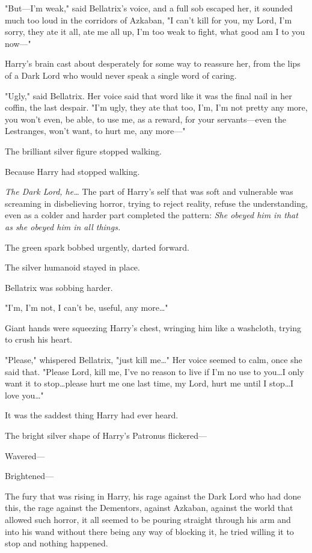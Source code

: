 "But---I'm weak," said Bellatrix's voice, and a full sob escaped her, it
sounded much too loud in the corridors of Azkaban, "I can't kill for you, my
Lord, I'm sorry, they ate it all, ate me all up, I'm too weak to fight, what
good am I to you now---"

Harry's brain cast about desperately for some way to reassure her, from the
lips of a Dark Lord who would never speak a single word of caring.

"Ugly," said Bellatrix. Her voice said that word like it was the final nail in
her coffin, the last despair. "I'm ugly, they ate that too, I'm, I'm not pretty
any more, you won't even, be able, to use me, as a reward, for your
servants---even the Lestranges, won't want, to hurt me, any more---"

The brilliant silver figure stopped walking.

Because Harry had stopped walking.

\emph{The Dark Lord, he…} The part of Harry's self that was soft and
vulnerable was screaming in disbelieving horror, trying to reject reality,
refuse the understanding, even as a colder and harder part completed the
pattern: \emph{She obeyed him in that as she obeyed him in all things.}

The green spark bobbed urgently, darted forward.

The silver humanoid stayed in place.

Bellatrix was sobbing harder.

"I'm, I'm not, I can't be, useful, any more…"

Giant hands were squeezing Harry's chest, wringing him like a washcloth, trying
to crush his heart.

"Please," whispered Bellatrix, "just kill me…" Her voice seemed to calm,
once she said that. "Please Lord, kill me, I've no reason to live if I'm no use
to you…I only want it to stop…please hurt me one last time, my
Lord, hurt me until I stop…I love you…"

It was the saddest thing Harry had ever heard.

The bright silver shape of Harry's Patronus flickered---

Wavered---

Brightened---

The fury that was rising in Harry, his rage against the Dark Lord who had done
this, the rage against the Dementors, against Azkaban, against the world that
allowed such horror, it all seemed to be pouring straight through his arm and
into his wand without there being any way of blocking it, he tried willing it
to stop and nothing happened.

